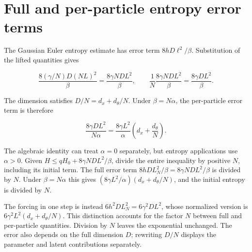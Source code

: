 \documentclass[11pt,a4paper]{article}
\begin{document}
\section{\texorpdfstring{Full and per-particle entropy error terms}{Full and per-particle entropy error terms}}


The Gaussian Euler entropy estimate has error term \(8hD\ell^2/\beta\). Substitution of the lifted quantities gives

\[\frac{8(\gamma/N)D(NL)^2}{\beta}=\frac{8\gamma ND L^2}{\beta},\qquad \frac1N\frac{8\gamma ND L^2}{\beta}=\frac{8\gamma DL^2}{\beta}.\]

The dimension satisfies \(D/N=d_x+d_\theta/N\). Under \(\beta=N\alpha\), the per-particle error term is therefore

\[\frac{8\gamma DL^2}{N\alpha}=\frac{8\gamma L^2}{\alpha}\left(d_x+\frac{d_\theta}{N}\right).\]

The algebraic identity can treat \(\alpha=0\) separately, but entropy applications use \(\alpha>0\). Given \(H\le qH_0+8\gamma ND L^2/\beta\), divide the entire inequality by positive \(N\), including its initial term. The full error term \(8hDL_N^2/\beta=8\gamma NDL^2/\beta\) is divided by \(N\). Under \(\beta=N\alpha\) this gives \((8\gamma L^2/\alpha)(d_x+d_\theta/N)\), and the initial entropy is divided by \(N\).



The forcing in one step is instead \(6h^2DL_N^2=6\gamma^2DL^2\), whose normalized version is \(6\gamma^2L^2(d_x+d_\theta/N)\). This distinction accounts for the factor \(N\) between full and per-particle quantities. Division by \(N\) leaves the exponential unchanged. The error also depends on the full dimension \(D\); rewriting \(D/N\) displays the parameter and latent contributions separately.
\end{document}
